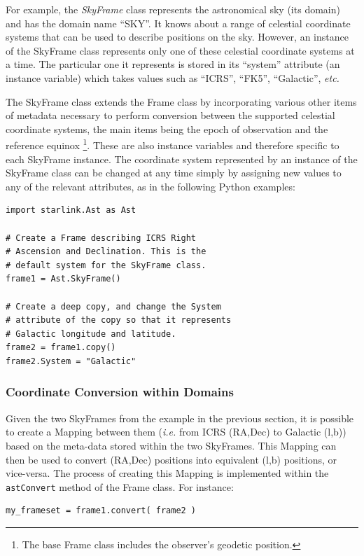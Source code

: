 \documentclass[final,authoryear,5p,times,twocolumn]{elsarticle}
\begin{document}
For example, the \emph{SkyFrame} class represents the astronomical sky (its
domain) and has the domain name ``SKY''. It knows about a range of celestial
coordinate systems that can be used to describe positions on the sky.
However, an instance of the SkyFrame class represents only one of these
celestial coordinate systems at a time. The particular one it represents is
stored in its ``system'' attribute (an instance variable) which takes
values such as ``ICRS'', ``FK5'', ``Galactic'', \emph{etc.}

The SkyFrame class extends the Frame class by incorporating various other
items of metadata necessary to perform conversion between the supported
celestial coordinate systems, the main items being the epoch of observation
and the reference equinox \footnote{The base Frame class includes the
observer's geodetic position.}. These are also instance variables and
therefore specific to each SkyFrame instance. The coordinate system
represented by an instance of the SkyFrame class can be changed at any time
simply by assigning new values to any of the relevant attributes, as in
the following Python examples:

\begin{lstlisting}
import starlink.Ast as Ast

# Create a Frame describing ICRS Right
# Ascension and Declination. This is the
# default system for the SkyFrame class.
frame1 = Ast.SkyFrame()

# Create a deep copy, and change the System
# attribute of the copy so that it represents
# Galactic longitude and latitude.
frame2 = frame1.copy()
frame2.System = "Galactic"
\end{lstlisting}

\subsubsection{Coordinate Conversion within Domains}
\label{sec:domConversion}
Given the two SkyFrames from the example in the previous section, it is
possible to create a Mapping between them (\emph{i.e.} from ICRS (RA,Dec)
to Galactic (l,b)) based on the meta-data stored within the two
SkyFrames. This Mapping can then be used to convert (RA,Dec) positions
into equivalent (l,b) positions, or vice-versa. The process of creating
this Mapping is implemented within the \texttt{astConvert} method of the
Frame class. For instance:

\begin{lstlisting}
my_frameset = frame1.convert( frame2 )
\end{lstlisting}
\end{document}
